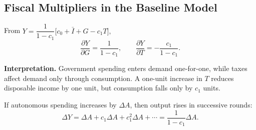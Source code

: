 \begin{center}
\end{center}

\subsection{Fiscal Multipliers in the Baseline Model}

\begin{keyformula}[title={Key Formula: Multipliers (holding other exogenous variables fixed)}]
From
\(
Y=\dfrac{1}{1-c_1}\bigl[c_0+\bar I+G-c_1T\bigr],
\)
\[
\frac{\partial Y}{\partial G} = \frac{1}{1-c_1},
\qquad
\frac{\partial Y}{\partial T} = -\frac{c_1}{1-c_1}.
\]
\end{keyformula}

\noindent
\textbf{Interpretation.}
Government spending enters demand one-for-one, while taxes affect demand only through consumption.
A one-unit increase in $T$ reduces disposable income by one unit, but consumption falls only by $c_1$ units.

\begin{keyformula}[title={Key Formula: Geometric-series intuition for the multiplier}]
If autonomous spending increases by $\Delta A$, then output rises in successive rounds:
\[
\Delta Y
= \Delta A + c_1\Delta A + c_1^2\Delta A + \cdots
= \frac{1}{1-c_1}\Delta A.
\]
\end{keyformula}

